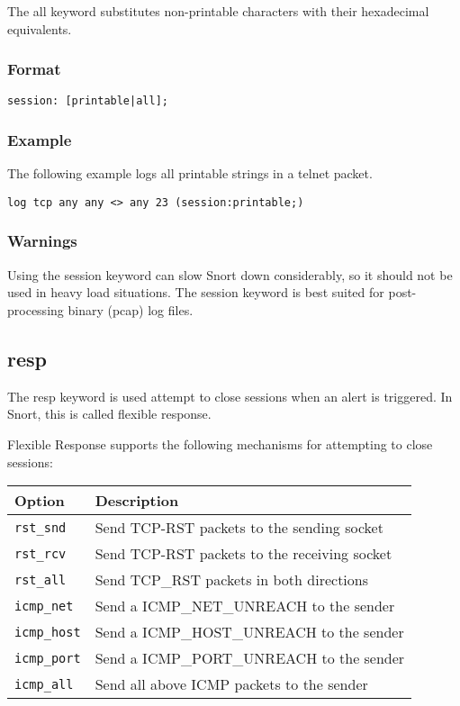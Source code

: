 \documentclass[english]{report}
\begin{document}
The all keyword substitutes non-printable characters with their hexadecimal
equivalents. 

\subsubsection{Format}

\begin{verbatim}
session: [printable|all];
\end{verbatim}

\subsubsection{Example}
The following example logs all printable strings in a telnet packet.
\begin{verbatim}
log tcp any any <> any 23 (session:printable;)
\end{verbatim}

\subsubsection{Warnings}
Using the session keyword can slow Snort down considerably, so it should not be
used in heavy load situations. The session keyword is best suited for
post-processing binary (pcap) log files. 

\subsection{resp}

The resp keyword is used attempt to close sessions when an alert is triggered.  In Snort, this is called flexible response.

Flexible Response supports the following mechanisms for attempting to close
sessions:

\begin{tabular}{| l | p{5in} |}
\hline
{\bf Option} & {\bf Description}\\
\hline
\hline
\texttt{rst\_snd} &  Send TCP-RST packets to the sending socket\\
\hline 
\texttt{rst\_rcv} & Send TCP-RST packets to the receiving socket\\
\hline 
\texttt{rst\_all} & Send TCP\_RST packets in both directions\\
\hline 
\texttt{icmp\_net} & Send a ICMP\_NET\_UNREACH to the sender\\
\hline 
\texttt{icmp\_host} & Send a ICMP\_HOST\_UNREACH to the sender\\
\hline 
\texttt{icmp\_port} & Send a ICMP\_PORT\_UNREACH to the sender\\
\hline 
\texttt{icmp\_all} & Send all above ICMP packets to the sender\\
\hline
\end{tabular}
\end{document}
